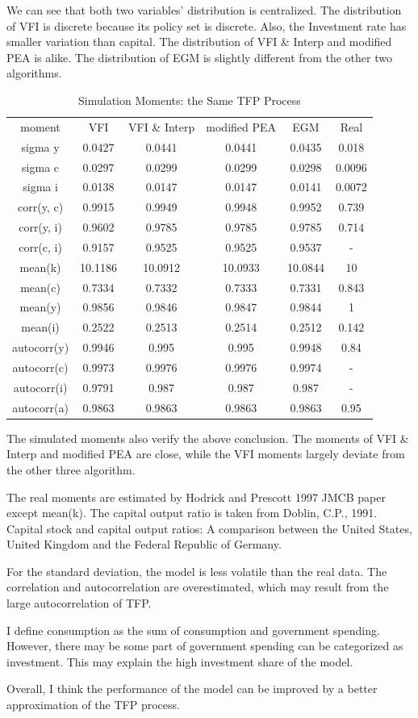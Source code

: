 \documentclass{article}
\begin{document}
	We can see that both two variables' distribution is centralized.
	The distribution of VFI is discrete because its policy set is discrete.
	Also, the Investment rate has smaller variation than capital.
	The distribution of VFI \& Interp and modified PEA is alike.
	The distribution of EGM is slightly different from the other two algorithms.
	
	\begin{table}[H]
		\centering
		\begin{tabular}{|cccccc|}
			\hline
			moment & VFI & VFI \& Interp & modified PEA & EGM & Real\\
			sigma y & 0.0427 & 0.0441 & 0.0441 & 0.0435 & 0.018\\
			sigma c & 0.0297 & 0.0299 & 0.0299 & 0.0298 & 0.0096\\
			sigma i & 0.0138 & 0.0147 & 0.0147 & 0.0141 & 0.0072\\
			corr(y, c) & 0.9915 & 0.9949 & 0.9948 & 0.9952 & 0.739\\
			corr(y, i) & 0.9602 & 0.9785 & 0.9785 & 0.9785 & 0.714\\
			corr(c, i) & 0.9157 & 0.9525 & 0.9525 & 0.9537 & -\\
			mean(k) & 10.1186 & 10.0912 & 10.0933 & 10.0844 & 10\\
			mean(c) & 0.7334 & 0.7332 & 0.7333 & 0.7331 & 0.843\\
			mean(y) & 0.9856 & 0.9846 & 0.9847 & 0.9844 & 1\\
			mean(i) & 0.2522 & 0.2513 & 0.2514 & 0.2512 & 0.142\\
			autocorr(y) & 0.9946 & 0.995 & 0.995 & 0.9948 & 0.84\\
			autocorr(c) & 0.9973 & 0.9976 & 0.9976 & 0.9974 & -\\
			autocorr(i) & 0.9791 & 0.987 & 0.987 & 0.987 & -\\
			autocorr(a) & 0.9863 & 0.9863 & 0.9863 & 0.9863 & 0.95\\
			\hline
		\end{tabular}
		\caption{Simulation Moments: the Same TFP Process}
		\label{tab:mom_same}
	\end{table}
	
	The simulated moments also verify the above conclusion.
	The moments of VFI \& Interp and modified PEA are close, while the VFI moments largely deviate from the other three algorithm.
	
	The real moments are estimated by Hodrick and Prescott 1997 JMCB paper except mean(k).
	The capital output ratio is taken from Doblin, C.P., 1991. Capital stock and capital output ratios: A comparison between the United States, United Kingdom and the Federal Republic of Germany.
	
	For the standard deviation, the model is less volatile than the real data.
	The correlation and autocorrelation are overestimated, which may result from the large autocorrelation of TFP.
	
	I define consumption as the sum of consumption and government spending.
	However, there may be some part of government spending can be categorized as investment.
	This may explain the high investment share of the model.
	
	Overall, I think the performance of the model can be improved by a better approximation of the TFP process.
\end{document}
